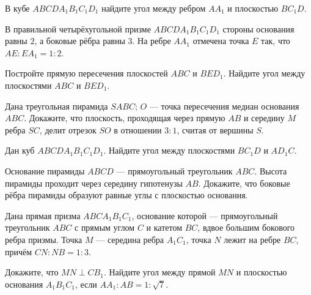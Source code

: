 \begin{class}[number=7]
	\begin{listofex}
		\item В кубе \(ABCDA_1B_1C_1D_1\) найдите угол между ребром \(AA_1\) и плоскостью \(BC_1D\).
		\item В правильной четырёхугольной призме \(ABCDA_1B_1C_1D_1\) стороны основания равны \(2\), а боковые рёбра равны \(3\). На ребре \(AA_1\) отмечена точка \(E\) так, что \(AE : EA_1=1 : 2\).
		\begin{tasks}
			\task Постройте прямую пересечения плоскостей \(ABC\) и \(BED_1\).
			\task Найдите угол между плоскостями \(ABC\) и \(BED_1\).
		\end{tasks}
		\item Дана треугольная пирамида \(SABC\); \(O\) --- точка пересечения медиан основания \(ABC\). Докажите, что плоскость, проходящая через прямую \(AB\) и середину \(M\) ребра \(SC\), делит отрезок \(SO\) в отношении \(3 : 1\), считая от вершины \(S\).
	\end{listofex}
\end{class}

\begin{class}[number=8]
	\begin{listofex}
		\item Дан куб \(ABCDA_1B_1C_1D_1\). Найдите угол между плоскостями \(BC_1D\) и \(AD_1C\).
		\item Основание пирамиды \(ABCD\) --- прямоугольный треугольник \(ABC\). Высота пирамиды проходит через середину гипотенузы \(AB\). Докажите, что боковые рёбра пирамиды образуют равные углы с плоскостью основания.
		\item Дана прямая призма \(ABCA_1B_1C_1\), основание которой --- прямоугольный треугольник \(ABC\) с прямым углом \(C\) и катетом \(BC\), вдвое большим бокового ребра призмы. Точка \(M\) --- середина ребра \(A_1C_1\), точка \(N\) лежит на ребре \(BC\), причём \(CN : NB=1 : 3\).
		\begin{tasks}
			\task Докажите, что \(MN \perp CB_1\).
			\task Найдите угол между прямой \(MN\) и плоскостью основания \(A_1B_1C_1\), если \(AA_1 : AB = 1 :\sqrt{7}\).
		\end{tasks}
	\end{listofex}
\end{class}


